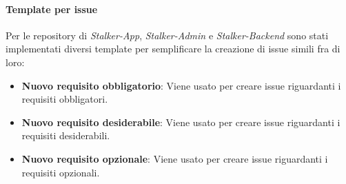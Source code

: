 \paragraph{Template per issue}
Per le repository di \textit{Stalker-App}, \textit{Stalker-Admin} e \textit{Stalker-Backend} sono stati implementati diversi template per semplificare la creazione di issue simili fra di loro:
\begin{itemize}
\item \textbf{Nuovo requisito obbligatorio}: Viene usato per creare issue riguardanti i requisiti obbligatori.
\item \textbf{Nuovo requisito desiderabile}: Viene usato per creare issue riguardanti i requisiti desiderabili.
\item \textbf{Nuovo requisito opzionale}: Viene usato per creare issue riguardanti i requisiti opzionali.
\end{itemize}

